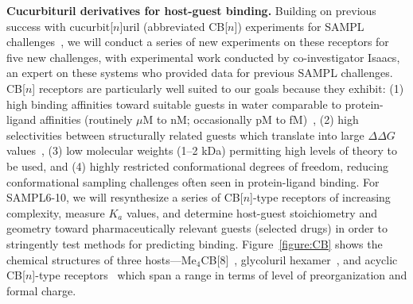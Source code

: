 \documentclass[11pt]{article}
\begin{document}
\textbf{Cucurbituril derivatives for host-guest binding.} 
Building on previous success with cucurbit[$n$]uril (abbreviated CB[$n$]) experiments for SAMPL challenges~\cite{ma_acyclic_2012-2, cao_absolute_2014, she_glycoluril-derived_2016}, we will conduct a series of new experiments on these receptors for five new challenges,
 with experimental work conducted by co-investigator Isaacs, an expert on these systems who provided data for previous SAMPL challenges.
CB[$n$] receptors are particularly well suited to our goals because they exhibit: (1) high binding affinities toward suitable guests in water comparable to protein-ligand affinities (routinely $\mu$M to nM; occasionally pM to fM)~\cite{cao_attomolar_2014, liu_cucurbituril_2005, mock_structure_1986, assaf_cucurbiturils:_2015, moghaddam_new_2011, shetty_can_2015, biedermann_release_2012}, (2) high selectivities between structurally related guests which translate into large $\Delta \Delta G$ values~\cite{isaacs_stimuli_2014}, (3) low molecular weights (1--2 kDa) permitting high levels of theory to be used, and (4) highly restricted conformational degrees of freedom, reducing conformational sampling challenges often seen in protein-ligand binding.
For SAMPL6-10, we will resynthesize a series of CB[$n$]-type receptors of increasing complexity, measure $K_a$ values, and determine host-guest stoichiometry and geometry toward pharmaceutically relevant guests (selected drugs) in order to stringently test methods for predicting binding.  
Figure~\ref{figure:CB} shows the chemical structures of three hosts---Me$_4$CB[8]~\cite{vinciguerra_synthesis_2015}, glycoluril hexamer~\cite{lucas_templated_2011}, and acyclic CB[$n$]-type receptors~\cite{ma_acyclic_2012, ma_acyclic_2012-1, zhang_acyclic_2014, gilberg_acyclic_2015, sigwalt_acyclic_2016, zhang_acyclic_2014-1} which span a range in terms of level of preorganization and formal charge.
\end{document}
